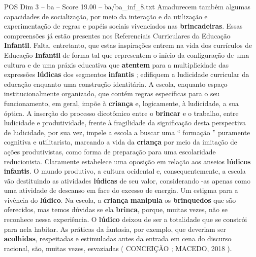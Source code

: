 \begin{textsample}{POS Dim 3 – ba – Score 19.00 – ba/ba\_inf\_8.txt}
Amadurecem também algumas capacidades de socialização, por meio da interação e da utilização e experimentação de regras e papéis sociais vivenciados nas \textbf{brincadeiras}.
Essas compreensões já estão presentes nos Referenciais Curriculares da Educação \textbf{Infantil}.
Falta, entretanto, que estas inspirações entrem na vida dos currículos de Educação \textbf{Infantil} de forma tal que representem o início da configuração de uma cultura e de uma práxis educativa que \textbf{atentem} para a multiplicidade das expressões \textbf{lúdicas} dos segmentos \textbf{infantis} ; edifiquem a ludicidade curricular da educação enquanto uma construção identitária.
A escola, enquanto espaço institucionalmente organizado, que contém regras específicas para o seu funcionamento, em geral, impõe à \textbf{criança} e, logicamente, à ludicidade, a sua óptica.
A inserção do processo dicotômico entre o \textbf{brincar} e o trabalho, entre ludicidade e produtividade, frente à fragilidade da significação desta perspectiva de ludicidade, por sua vez, impele a escola a buscar uma “ formação ” puramente cognitiva e utilitarista, marcando a vida da \textbf{criança} por meio da imitação de ações produtivistas, como forma de preparação para uma escolaridade reducionista.
Claramente estabelece uma oposição em relação aos anseios \textbf{lúdicos} \textbf{infantis}.
O mundo produtivo, a cultura ocidental e, consequentemente, a escola vão destituindo as atividades \textbf{lúdicas} de seu valor, considerando -as apenas como uma atividade de descanso em face do excesso de energia.
Um estigma para a vivência do \textbf{lúdico}.
Na escola, a \textbf{criança} \textbf{manipula} os \textbf{brinquedos} que são oferecidos, mas temos dúvidas se ela \textbf{brinca}, porque, muitas vezes, não se reconhece nessa experiência.
O \textbf{lúdico} deixou de ser a totalidade que se constrói para nela habitar.
As práticas da fantasia, por exemplo, que deveriam ser \textbf{acolhidas}, respeitadas e estimuladas antes da entrada em cena do discurso racional, são, muitas vezes, esvaziadas ( CONCEIÇÃO ; MACEDO, 2018 ).

\end{textsample}
